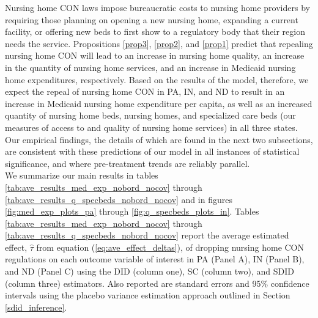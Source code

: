 \documentclass[../Main.tex]{subfiles}
\begin{document}
Nursing home CON laws impose bureaucratic costs to nursing home providers by requiring those planning on opening a new nursing home, expanding a current facility, or offering new beds to first show to a regulatory body that their region needs the service. Propositions \ref{prop3}, \ref{prop2}, and \ref{prop1} predict that repealing nursing home CON will lead to an increase in nursing home quality, an increase in the quantity of nursing home services, and an increase in Medicaid nursing home expenditures, respectively. Based on the results of the model, therefore, we expect the repeal of nursing home CON in PA, IN, and ND to result in an increase in Medicaid nursing home expenditure per capita, as well as an increased quantity of nursing home beds, nursing homes, and specialized care beds (our measures of access to and quality of nursing home services) in all three states. Our empirical findings, the details of which are found in the next two subsections, are consistent with these predictions of our model in all instances of statistical significance, and where pre-treatment trends are reliably parallel.\\
\indent We summarize our main results in tables \ref{tab:ave_results_med_exp_nobord_nocov} through \ref{tab:ave_results_q_specbeds_nobord_nocov} and in figures \ref{fig:med_exp_plots_pa} through \ref{fig:q_specbeds_plots_in}. Tables \ref{tab:ave_results_med_exp_nobord_nocov} through \ref{tab:ave_results_q_specbeds_nobord_nocov} report the average estimated effect, $\hat{\tau}$ from equation (\ref{eq:ave_effect_deltas}), of dropping nursing home CON regulations on each outcome variable of interest in PA (Panel A), IN (Panel B), and ND (Panel C) using the DID (column one), SC (column two), and SDID (column three) estimators. Also reported are standard errors and 95\% confidence intervals using the placebo variance estimation approach outlined in Section \ref{sdid_inference}.\\
\end{document}
